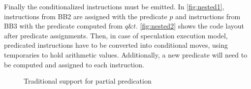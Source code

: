 Finally the conditionalized instructions must be emitted. In \ref{fig:nested1}, instructions from BB2 are assigned with the predicate $p$ and instructions from BB3 with the predicate computed from $q\&t$. \ref{fig:nested2} shows the code layout after predicate assignments. Then, in case of speculation execution model, predicated instructions have to be converted into conditional moves, using temporaries to hold arithmetic values. Additionally, a new predicate will need to be computed and assigned to each instruction.

\begin{figure}
\centering
\caption{Traditional support for partial predication}
\label{fig:trad_part_pred}
\end{figure}

